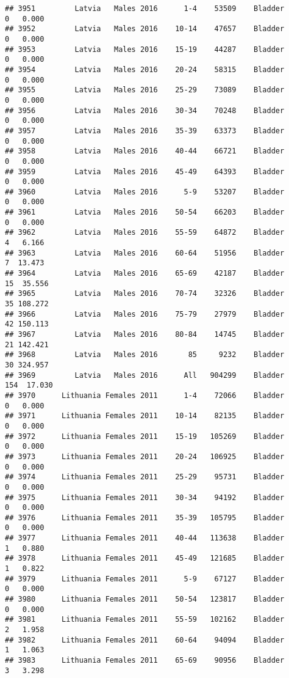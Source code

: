 \documentclass[
]{article}
\begin{document}
\begin{verbatim}
## 3951         Latvia   Males 2016      1-4    53509    Bladder      0   0.000
## 3952         Latvia   Males 2016    10-14    47657    Bladder      0   0.000
## 3953         Latvia   Males 2016    15-19    44287    Bladder      0   0.000
## 3954         Latvia   Males 2016    20-24    58315    Bladder      0   0.000
## 3955         Latvia   Males 2016    25-29    73089    Bladder      0   0.000
## 3956         Latvia   Males 2016    30-34    70248    Bladder      0   0.000
## 3957         Latvia   Males 2016    35-39    63373    Bladder      0   0.000
## 3958         Latvia   Males 2016    40-44    66721    Bladder      0   0.000
## 3959         Latvia   Males 2016    45-49    64393    Bladder      0   0.000
## 3960         Latvia   Males 2016      5-9    53207    Bladder      0   0.000
## 3961         Latvia   Males 2016    50-54    66203    Bladder      0   0.000
## 3962         Latvia   Males 2016    55-59    64872    Bladder      4   6.166
## 3963         Latvia   Males 2016    60-64    51956    Bladder      7  13.473
## 3964         Latvia   Males 2016    65-69    42187    Bladder     15  35.556
## 3965         Latvia   Males 2016    70-74    32326    Bladder     35 108.272
## 3966         Latvia   Males 2016    75-79    27979    Bladder     42 150.113
## 3967         Latvia   Males 2016    80-84    14745    Bladder     21 142.421
## 3968         Latvia   Males 2016       85     9232    Bladder     30 324.957
## 3969         Latvia   Males 2016      All   904299    Bladder    154  17.030
## 3970      Lithuania Females 2011      1-4    72066    Bladder      0   0.000
## 3971      Lithuania Females 2011    10-14    82135    Bladder      0   0.000
## 3972      Lithuania Females 2011    15-19   105269    Bladder      0   0.000
## 3973      Lithuania Females 2011    20-24   106925    Bladder      0   0.000
## 3974      Lithuania Females 2011    25-29    95731    Bladder      0   0.000
## 3975      Lithuania Females 2011    30-34    94192    Bladder      0   0.000
## 3976      Lithuania Females 2011    35-39   105795    Bladder      0   0.000
## 3977      Lithuania Females 2011    40-44   113638    Bladder      1   0.880
## 3978      Lithuania Females 2011    45-49   121685    Bladder      1   0.822
## 3979      Lithuania Females 2011      5-9    67127    Bladder      0   0.000
## 3980      Lithuania Females 2011    50-54   123817    Bladder      0   0.000
## 3981      Lithuania Females 2011    55-59   102162    Bladder      2   1.958
## 3982      Lithuania Females 2011    60-64    94094    Bladder      1   1.063
## 3983      Lithuania Females 2011    65-69    90956    Bladder      3   3.298

\end{verbatim}
\end{document}
